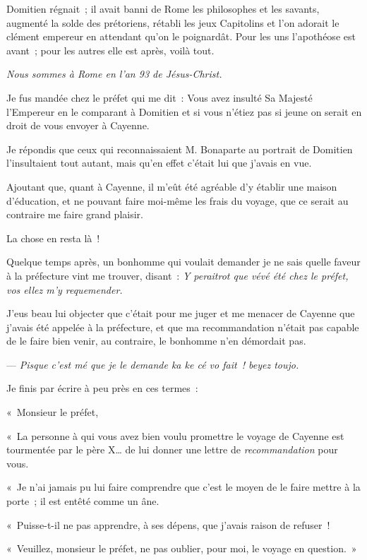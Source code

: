 \documentclass[french,twoside]{book} %
\newenvironment{quoteblock}%
  {\begin{quoting}}
  {\end{quoting}}
\newenvironment{quotebar}{%
    \def\FrameCommand{{\color{rubric!10!}\vrule width 0.5em} \hspace{0.9em}}%
    \def\OuterFrameSep{\itemsep} %
    \MakeFramed {\advance\hsize-\width \FrameRestore}
  }%
  {%
    \endMakeFramed
  }
\renewenvironment{quoteblock}%
  {%
    \savenotes
    \setstretch{0.9}
    \normalfont
    \begin{quotebar}
  }
  {%
    \end{quotebar}
    \spewnotes
  }
\begin{document}
\begin{quoteblock}
 \noindent Domitien régnait ; il avait banni de Rome les philosophes et les savants, augmenté la solde des prétoriens, rétabli les jeux Capitolins et l’on adorait le clément empereur en attendant qu’on le poignardât. Pour les uns l’apothéose est avant ; pour les autres elle est après, voilà tout.\par
 \emph{Nous sommes à Rome en l’an 93 de Jésus-Christ.}
 \end{quoteblock}

\noindent Je fus mandée chez le préfet qui me dit : Vous avez insulté Sa Majesté l’Empereur en le comparant à Domitien et si vous n’étiez pas si jeune on serait en droit de vous envoyer à Cayenne.\par
Je répondis que ceux qui reconnaissaient M. Bonaparte au portrait de Domitien l’insultaient tout autant, mais qu’en effet c’était lui que j’avais en vue.\par
Ajoutant que, quant à Cayenne, il m’eût été agréable d’y établir une maison d’éducation, et ne pouvant faire moi-même les frais du voyage, que ce serait au contraire me faire grand plaisir.\par
La chose en resta là !\par
Quelque temps après, un bonhomme qui voulait demander je ne sais quelle faveur à la préfecture vint me trouver, disant : \emph{Y peraitrot que vévé été chez le préfet, vos ellez m’y requemender.}\par
J’eus beau lui objecter que c’était pour me juger et me menacer de Cayenne que j’avais  été appelée à la préfecture, et que ma recommandation n’était pas capable de le faire bien venir, au contraire, le bonhomme n’en démordait pas.\par
— \emph{Pisque c’est mé que je le demande ka ke cé vo fait ! beyez toujo.}\par
Je finis par écrire à peu près en ces termes :\par

\begin{quoteblock}
 \noindent « Monsieur le préfet,\par
 \bigbreak
 \noindent « La personne à qui vous avez bien voulu promettre le voyage de Cayenne est tourmentée par le père X… de lui donner une lettre de \emph{recommandation} pour vous.\par
 « Je n’ai jamais pu lui faire comprendre que c’est le moyen de le faire mettre à la porte ; il est entêté comme un âne.\par
 « Puisse-t-il ne pas apprendre, à ses dépens, que j’avais raison de refuser !\par
 « Veuillez, monsieur le préfet, ne pas oublier, pour moi, le voyage en question. »
 \end{quoteblock}
\end{document}
